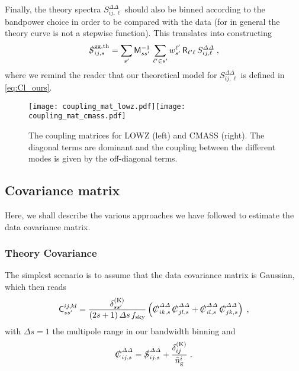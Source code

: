\documentclass[astrosymb,twocolumn]{aastex631}
\begin{document}
Finally,  the theory spectra \(S^{\varDelta\varDelta}_{ij,\ell}\) should also be binned according to the bandpower choice in order to be compared with the data (for in general the theory curve is not a stepwise function). This translates into constructing
\begin{equation}
\slashed{S}^{\rm gg,th}_{ij,s}=\sum_{s^\prime} \mathsf M^{-1}_{ss^\prime}\,\sum_{\ell^\prime \in s^\prime}{w^{\ell^\prime}_{s^\prime}}\,\mathsf R_{\ell^\prime\ell}\,S^{\varDelta\varDelta}_{ij,\ell}\;,
    \label{eq:bandpower5}
\end{equation}
where we remind the reader that our theoretical model for \(S^{\varDelta\varDelta}_{ij,\ell}\) is defined in \autoref{eq:Cl_ours}.
\begin{figure*}
\centering
\texttt{[image: coupling\_mat\_lowz.pdf]}\texttt{[image: coupling\_mat\_cmass.pdf]}
\caption{The coupling matrices for LOWZ (left) and CMASS (right). The diagonal terms are dominant and the coupling between the different modes is given by the off-diagonal terms.}
\label{fig:coupling_matrix}
\end{figure*}

\subsection{Covariance matrix}
Here, we shall describe the various approaches we have followed to estimate the data covariance matrix.

\subsubsection{Theory Covariance}
\label{subsec:Gauss}
The simplest scenario is to assume that the data covariance matrix is Gaussian, which then reads
\begin{equation}
\mathsf C^{ij,kl}_{ss^\prime}=
\frac{\delta^{\rm(K)}_{ss^\prime}}{(2s+1)\,\varDelta{s}\, f_{\rm sky}}\left(\slashed{C}^{\varDelta\varDelta}_{ik,s}\,\slashed{C}^{\varDelta\varDelta}_{jl,s}
+\slashed{C}^{\varDelta\varDelta}_{il,s}\,\slashed{C}^{\varDelta\varDelta}_{jk,s}\right)\;,\label{eq:gauss_covmat}
\end{equation}
with \(\varDelta{s=1}\) the multipole range in our bandwidth binning and
\begin{equation}
\slashed{C}^{\varDelta\varDelta}_{ij,s} = \slashed{S}^{\varDelta\varDelta}_{ij,s} + \frac{\delta^{\rm(K)}_{ij}}{\bar n^i_{\rm g}}\;.
    \label{eq:noise}
\end{equation}
\end{document}
